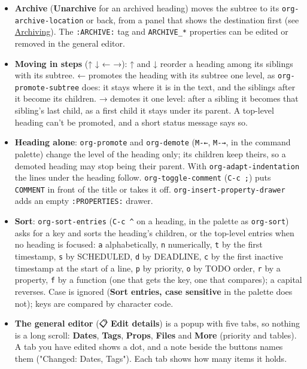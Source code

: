 \documentclass[11pt]{article}
\begin{document}
\begin{itemize}
\item \textbf{Archive} (\textbf{Unarchive} for an archived heading) moves the subtree to its \texttt{org-archive-location} or back, from a panel that shows the destination first (see \hyperref[sec:orgf736f7c]{Archiving}). The \texttt{:ARCHIVE:} tag and \texttt{ARCHIVE\_*} properties can be edited or removed in the general editor.
\item \textbf{Moving in steps} (↑ ↓ ← →): ↑ and ↓ reorder a heading among its siblings with its subtree. ← promotes the heading with its subtree one level, as \texttt{org-promote-subtree} does: it stays where it is in the text, and the siblings after it become its children. → demotes it one level: after a sibling it becomes that sibling's last child, as a first child it stays under its parent. A top-level heading can't be promoted, and a short status message says so.
\item \textbf{Heading alone}: \texttt{org-promote} and \texttt{org-demote} (\texttt{M-←}, \texttt{M-→}, in the command palette) change the level of the heading only; its children keep theirs, so a demoted heading may stop being their parent. With \texttt{org-adapt-indentation} the lines under the heading follow. \texttt{org-toggle-comment} (\texttt{C-c ;}) puts \texttt{COMMENT} in front of the title or takes it off. \texttt{org-insert-property-drawer} adds an empty \texttt{:PROPERTIES:} drawer.
\item \textbf{Sort}: \texttt{org-sort-entries} (\texttt{C-c \textasciicircum{}} on a heading, in the palette as \texttt{org-sort}) asks for a key and sorts the heading's children, or the top-level entries when no heading is focused: \texttt{a} alphabetically, \texttt{n} numerically, \texttt{t} by the first timestamp, \texttt{s} by SCHEDULED, \texttt{d} by DEADLINE, \texttt{c} by the first inactive timestamp at the start of a line, \texttt{p} by priority, \texttt{o} by TODO order, \texttt{r} by a property, \texttt{f} by a function (one that gets the key, one that compares); a capital reverses. Case is ignored (\textbf{Sort entries, case sensitive} in the palette does not); keys are compared by character code.
\item \textbf{The general editor} (📋 \textbf{Edit details}) is a popup with five tabs, so nothing is a long scroll: \textbf{Dates}, \textbf{Tags}, \textbf{Props}, \textbf{Files} and \textbf{More} (priority and tables). A tab you have edited shows a dot, and a note beside the buttons names them ("Changed: Dates, Tags"). Each tab shows how many items it holds.
\begin{itemize}

\end{itemize}
\end{itemize}
\end{document}
